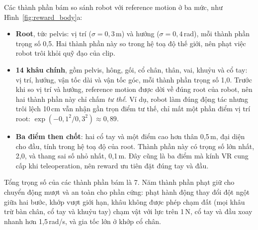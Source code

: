 \documentclass[12pt,a4paper,oneside]{report}
\begin{document}
Các thành phần bám so sánh robot với reference motion ở ba mức, như Hình~\ref{fig:reward_body}a:
\begin{itemize}
\item \textbf{Root}, tức pelvis: vị trí ($\sigma = 0{,}3$\,m) và hướng ($\sigma = 0{,}4$\,rad), mỗi thành phần trọng số 0,5. Hai thành phần này so trong hệ toạ độ thế giới, nên phạt việc robot trôi khỏi quỹ đạo của clip.
\item \textbf{14 khâu chính}, gồm pelvis, hông, gối, cổ chân, thân, vai, khuỷu và cổ tay: vị trí, hướng, vận tốc dài và vận tốc góc, mỗi thành phần trọng số 1,0. Trước khi so vị trí và hướng, reference motion được dời về đúng root của robot, nên hai thành phần này chỉ chấm \emph{tư thế}. Ví dụ, robot làm đúng động tác nhưng trôi lệch 10\,cm vẫn nhận gần trọn điểm tư thế, chỉ mất một phần điểm vị trí root: $\exp(-0{,}1^2/0{,}3^2) \approx 0{,}89$.
\item \textbf{Ba điểm then chốt}: hai cổ tay và một điểm cao hơn thân 0,5\,m, đại diện cho đầu, tính trong hệ toạ độ của root. Thành phần này có trọng số lớn nhất, 2,0, và thang sai số nhỏ nhất, 0,1\,m. Đây cũng là ba điểm mà kính VR cung cấp khi teleoperation, nên reward ưu tiên đặt đúng tay và đầu.
\end{itemize}
Tổng trọng số của các thành phần bám là 7. Năm thành phần phạt giữ cho chuyển động mượt và an toàn cho phần cứng: phạt hành động thay đổi đột ngột giữa hai bước, khớp vượt giới hạn, khâu không được phép chạm đất (mọi khâu trừ bàn chân, cổ tay và khuỷu tay) chạm vật với lực trên 1\,N, cổ tay và đầu xoay nhanh hơn 1,5\,rad/s, và gia tốc lớn ở khớp cổ chân.
\end{document}
